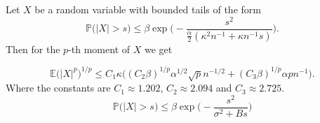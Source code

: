 \documentclass[10pt,a4paper]{amsart}
\newcommand{\E}{\ensuremath{\mathbb{E}}}
\newcommand{\p}{\ensuremath{\mathbb{P}}}
\begin{document}
    \begin{cor}
    Let \( X \) be a random variable with bounded tails of the form 
    \begin{equation} \label{Tail}
    \p \Big( \big\vert X \big\vert > s \Big) \leq \beta\exp\Big(- \frac{s^2}{\frac{\alpha}{2}(\kappa^2 n^{-1}+ \kappa n^{-1} s)} \Big).
    \end{equation}
    Then for the \(p\)-th moment of \(X\) we get

\begin{equation} \label{Moment}
\E\big(\vert X \vert^p\big)^{1/p} \leq C_1 \kappa \big( (C_2\beta)^{1/p} \alpha^{1/2} \sqrt{p} n^{-1/2} + (C_3\beta)^{1/p} \alpha p n^{-1} \big).
\end{equation}
Where the constants are \(C_1 \approx 1.202\), \(C_2 \approx 2.094\) and \(C_3 \approx 2.725\).
$$    
    \p \Big( \big\vert X \big\vert > s \Big) \leq \beta\exp\Big(- \frac{s^2}{\sigma^2+ B s} \Big)
$$


\end{cor}
\end{document}
